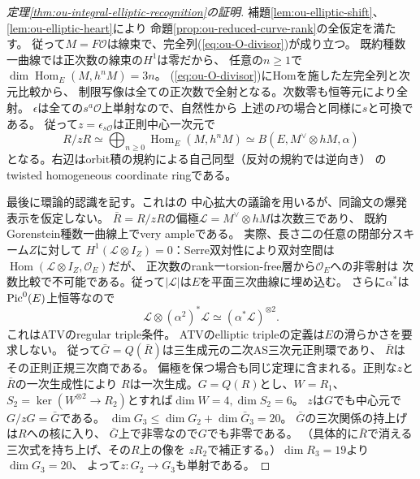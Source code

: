 \begin{proof}[定理\ref{thm:ou-integral-elliptic-recognition}の証明]
補題\ref{lem:ou-elliptic-shift}、\ref{lem:ou-elliptic-heart}により
命題\ref{prop:ou-reduced-curve-rank}の全仮定を満たす。
従って$M=F\mathcal O$は線束で、完全列(\ref{eq:ou-O-divisor})が成り立つ。
既約種数一曲線では正次数の線束の$H^1$は零だから、
任意の$n\geq1$で$\dim\operatorname{Hom}_E(M,h^nM)=3n$。
(\ref{eq:ou-O-divisor})にHomを施した左完全列と次元比較から、
制限写像は全ての正次数で全射となる。次数零も恒等元により全射。
$\epsilon$は全ての$s^a\mathcal O$上単射なので、自然性から
上述の$P$の場合と同様に$s$と可換である。
従って$z=\epsilon_{s\mathcal O}$は正則中心一次元で
\begin{equation}\label{eq:ou-R-mod-z}
 R/zR\simeq \bigoplus_{n\geq0}\operatorname{Hom}_E(M,h^nM)
 \simeq B(E,M^\vee\otimes hM,\alpha)
\end{equation}
となる。右辺はorbit積の規約による自己同型（反対の規約では逆向き）
のtwisted homogeneous coordinate ringである。

最後に環論的認識を記す。これは\cite[Section~12]{VdBBlowup2001}の
中心拡大の議論を用いるが、同論文の爆発表示を仮定しない。
$\bar R=R/zR$の偏極$\mathcal L=M^\vee\otimes hM$は次数三であり、
既約Gorenstein種数一曲線上でvery ampleである。
実際、長さ二の任意の閉部分スキーム$Z$に対して
$H^1(\mathcal L\otimes I_Z)=0$：Serre双対性により双対空間は
$\operatorname{Hom}(\mathcal L\otimes I_Z,\mathcal O_E)$だが、
正次数のrank一torsion-free層から$\mathcal O_E$への非零射は
次数比較で不可能である。従って$|\mathcal L|$は$E$を平面三次曲線に埋め込む。
さらに$\alpha^*$は$\operatorname{Pic}^0(E)$上恒等なので
\[
 \mathcal L\otimes(\alpha^{2})^*\mathcal L
      \simeq(\alpha^*\mathcal L)^{\otimes2}.
\]
これはATV\cite[(4.8), Theorems~6.6, 6.8]{ATV1990}のregular triple条件。
ATVのelliptic tripleの定義は$E$の滑らかさを要求しない。
従って$\bar G=Q(\bar R)$は三生成元の二次AS三次元正則環であり、
$\bar R$はその正則正規三次商である。
偏極を保つ場合も同じ定理に含まれる。正則な$z$と$\bar R$の一次生成性により
$R$は一次生成。$G=Q(R)$とし、$W=R_1$、
$S_2=\ker(W^{\otimes2}\to R_2)$とすれば$\dim W=4,\dim S_2=6$。
$z$は$G$でも中心元で$G/zG=\bar G$である。
$\dim G_3\leq\dim G_2+\dim\bar G_3=20$。
$\bar G$の三次関係の持上げは$R$への核に入り、
$\bar G$上で非零なので$G$でも非零である。
（具体的に$\bar R$で消える三次式を持ち上げ、その$R$上の像を
$zR_2$で補正する。）$\dim R_3=19$より$\dim G_3=20$、
よって$z:G_2\to G_3$も単射である。


\end{proof}
